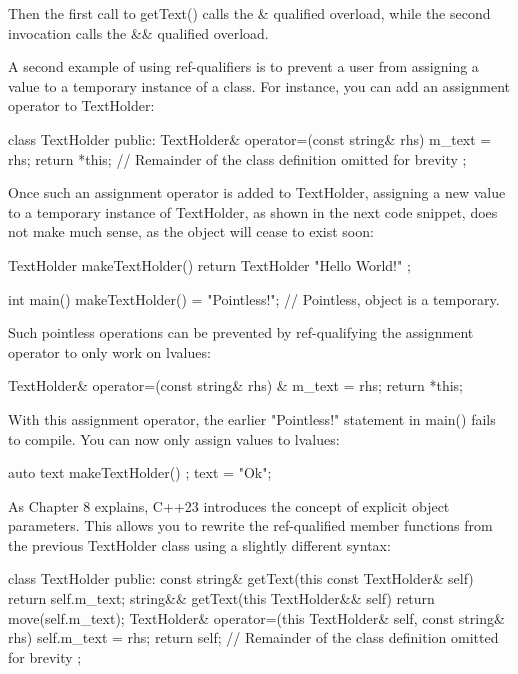 Then the first call to getText() calls the \& qualified overload, while the second invocation calls the \&\& qualified overload.

A second example of using ref-qualifiers is to prevent a user from assigning a value to a temporary instance of a class. For instance, you can add an assignment operator to TextHolder:

\begin{cpp}
class TextHolder
{
    public:
        TextHolder& operator=(const string& rhs) { m_text = rhs; return *this; }
    // Remainder of the class definition omitted for brevity
};
\end{cpp}

Once such an assignment operator is added to TextHolder, assigning a new value to a temporary instance of TextHolder, as shown in the next code snippet, does not make much sense, as the object will cease to exist soon:

\begin{cpp}
TextHolder makeTextHolder() { return TextHolder { "Hello World!" }; }

int main()
{
    makeTextHolder() = "Pointless!"; // Pointless, object is a temporary.
}
\end{cpp}

Such pointless operations can be prevented by ref-qualifying the assignment operator to only work on lvalues:

\begin{cpp}
TextHolder& operator=(const string& rhs) & { m_text = rhs; return *this; }
\end{cpp}

With this assignment operator, the earlier "Pointless!" statement in main() fails to compile. You can now only assign values to lvalues:

\begin{cpp}
auto text { makeTextHolder() };
text = "Ok";
\end{cpp}



As Chapter 8 explains, C++23 introduces the concept of explicit object parameters. This allows you to rewrite the ref-qualified member functions from the previous TextHolder class using a slightly different syntax:

\begin{cpp}
class TextHolder
{
    public:
        const string& getText(this const TextHolder& self) { return self.m_text; }
        string&& getText(this TextHolder&& self) { return move(self.m_text); }
        TextHolder& operator=(this TextHolder& self, const string& rhs)
        {
            self.m_text = rhs;
            return self;
        }
    // Remainder of the class definition omitted for brevity
};
\end{cpp}

